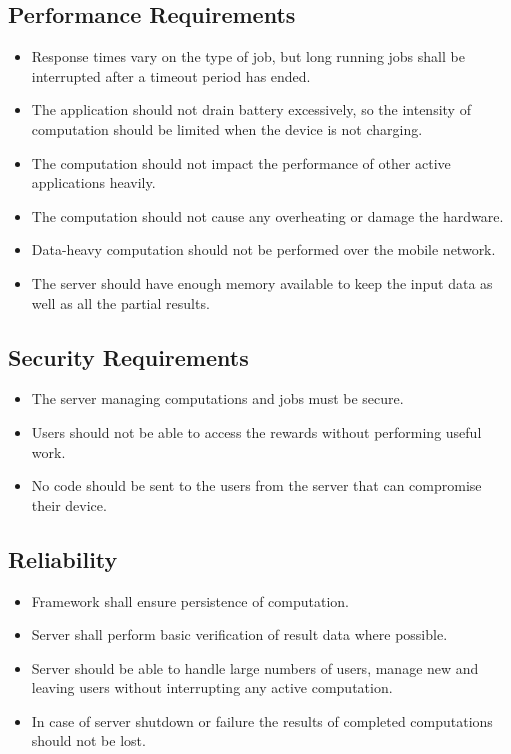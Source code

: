 \documentclass[a4paper,10pt]{article}
\begin{document}
\subsection{Performance Requirements}

\begin{itemize}
	\item Response times vary on the type of job, but long running jobs shall be interrupted after a timeout period has ended.
	\item The application should not drain battery excessively, so the intensity of computation should be limited when the device is not charging.
	\item The computation should not impact the performance of other active applications heavily.
	\item The computation should not cause any overheating or damage the hardware.
	\item Data-heavy computation should not be performed over the mobile network.
	\item The server should have enough memory available to keep the input data as well as all the partial results.
\end{itemize} 

\subsection{Security Requirements}

\begin{itemize}
	\item The server managing computations and jobs must be secure.
	\item Users should not be able to access the rewards without performing useful work.
	\item No code should be sent to the users from the server that can compromise their device.
\end{itemize} 

\subsection{Reliability}

\begin{itemize}
	\item Framework shall ensure persistence of computation.
	\item Server shall perform basic verification of result data where possible.
	\item Server should be able to handle large numbers of users, manage new and leaving users without interrupting any active computation.
	\item In case of server shutdown or failure the results of completed computations should not be lost.
\end{itemize} 
\end{document}
